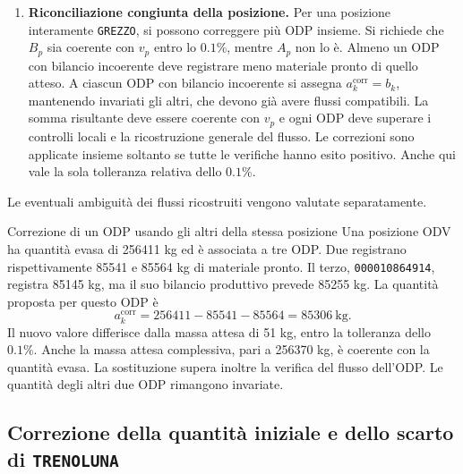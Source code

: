 \begin{enumerate}[label=\arabic*.,itemsep=6pt]
\item \textbf{Riconciliazione congiunta della posizione.} Per una posizione interamente \texttt{GREZZO}, si possono correggere più ODP insieme. Si richiede che $B_p$ sia coerente con $v_p$ entro lo $0.1\%$, mentre $A_p$ non lo è. Almeno un ODP con bilancio incoerente deve registrare meno materiale pronto di quello atteso. A ciascun ODP con bilancio incoerente si assegna $a_k^{\mathrm{corr}}=b_k$, mantenendo invariati gli altri, che devono già avere flussi compatibili. La somma risultante deve essere coerente con $v_p$ e ogni ODP deve superare i controlli locali e la ricostruzione generale del flusso. Le correzioni sono applicate insieme soltanto se tutte le verifiche hanno esito positivo. Anche qui vale la sola tolleranza relativa dello $0.1\%$.
\end{enumerate}

Le eventuali ambiguità dei flussi ricostruiti vengono valutate separatamente.

\begingroup
{}
\begin{examplebox}{Correzione di un ODP usando gli altri della stessa posizione}
Una posizione ODV ha quantità evasa di \num{256411} kg ed è associata a tre ODP. Due registrano rispettivamente \num{85541} e \num{85564} kg di materiale pronto. Il terzo, \texttt{000010864914}, registra \num{85145} kg, ma il suo bilancio produttivo prevede \num{85255} kg. La quantità proposta per questo ODP è
\begin{equation}
\label{eq:ready-residual-example}
a_k^{\mathrm{corr}}=\num{256411}-\num{85541}-\num{85564}=\num{85306}\ \mathrm{kg}.
\end{equation}
Il nuovo valore differisce dalla massa attesa di 51 kg, entro la tolleranza dello $0.1\%$. Anche la massa attesa complessiva, pari a \num{256370} kg, è coerente con la quantità evasa. La sostituzione supera inoltre la verifica del flusso dell'ODP. Le quantità degli altri due ODP rimangono invariate.
\end{examplebox}
\endgroup

\subsection{Correzione della quantità iniziale e dello scarto di \texttt{TRENOLUNA}}
\label{sec:root-mass-corrections}

